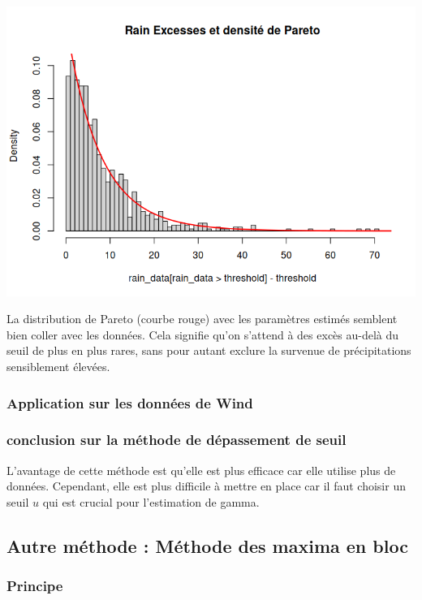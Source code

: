 \documentclass{article}
\begin{document}
\begin{center}
	\includegraphics[scale=0.8]{./images/rainhistodensite.png} 
\end{center}

La distribution de Pareto (courbe rouge) avec les paramètres estimés semblent bien coller avec les données. Cela signifie qu’on s’attend à des excès au-delà du seuil de plus en plus rares, sans pour autant exclure la survenue de précipitations sensiblement élevées.

\subsubsection{Application sur les données de Wind}



\subsubsection{conclusion sur la méthode de dépassement de seuil}
L'avantage de cette méthode est qu'elle est plus efficace car elle utilise plus de données. Cependant, elle est plus difficile à mettre en place car il faut choisir un seuil $u$ qui est crucial pour l'estimation de gamma.



\subsection{Autre méthode : Méthode des maxima en bloc}
\subsubsection{Principe}
\end{document}
